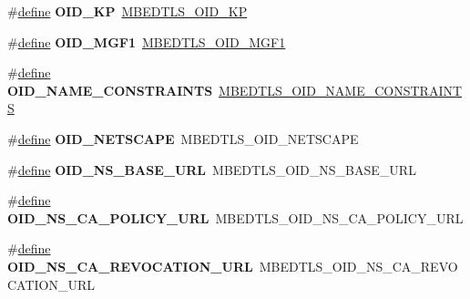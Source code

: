 \begin{DoxyCompactItemize}
\item 
\mbox{\label{compat-1_83_8h_a07ee4653fa24c1791a7e03db0a4e622c}} 
\#\hyperlink{structdefine}{define} {\bfseries O\+I\+D\+\_\+\+KP}~\hyperlink{oid_8h_a00f4d4d98ab235a1e3b5f3dcaf2e14f8}{M\+B\+E\+D\+T\+L\+S\+\_\+\+O\+I\+D\+\_\+\+KP}
\item 
\mbox{\label{compat-1_83_8h_a034e20febccf741aee9978e5e2f9c7e1}} 
\#\hyperlink{structdefine}{define} {\bfseries O\+I\+D\+\_\+\+M\+G\+F1}~\hyperlink{oid_8h_a41d20b2f31811636313feeafcd7959b9}{M\+B\+E\+D\+T\+L\+S\+\_\+\+O\+I\+D\+\_\+\+M\+G\+F1}
\item 
\mbox{\label{compat-1_83_8h_a7c1e723effe9aeccb1e5184c963e99a5}} 
\#\hyperlink{structdefine}{define} {\bfseries O\+I\+D\+\_\+\+N\+A\+M\+E\+\_\+\+C\+O\+N\+S\+T\+R\+A\+I\+N\+TS}~\hyperlink{oid_8h_acdfbc5ead965aaec5b1f82a575a8b2d2}{M\+B\+E\+D\+T\+L\+S\+\_\+\+O\+I\+D\+\_\+\+N\+A\+M\+E\+\_\+\+C\+O\+N\+S\+T\+R\+A\+I\+N\+TS}
\item 
\mbox{\label{compat-1_83_8h_a8731e59179aae8c01c3b2d658869cc0c}} 
\#\hyperlink{structdefine}{define} {\bfseries O\+I\+D\+\_\+\+N\+E\+T\+S\+C\+A\+PE}~M\+B\+E\+D\+T\+L\+S\+\_\+\+O\+I\+D\+\_\+\+N\+E\+T\+S\+C\+A\+PE
\item 
\mbox{\label{compat-1_83_8h_aafda755a94c6ce20ed39e0afdc820d57}} 
\#\hyperlink{structdefine}{define} {\bfseries O\+I\+D\+\_\+\+N\+S\+\_\+\+B\+A\+S\+E\+\_\+\+U\+RL}~M\+B\+E\+D\+T\+L\+S\+\_\+\+O\+I\+D\+\_\+\+N\+S\+\_\+\+B\+A\+S\+E\+\_\+\+U\+RL
\item 
\mbox{\label{compat-1_83_8h_a011c64b98f16e59f56cd49065ce1aee3}} 
\#\hyperlink{structdefine}{define} {\bfseries O\+I\+D\+\_\+\+N\+S\+\_\+\+C\+A\+\_\+\+P\+O\+L\+I\+C\+Y\+\_\+\+U\+RL}~M\+B\+E\+D\+T\+L\+S\+\_\+\+O\+I\+D\+\_\+\+N\+S\+\_\+\+C\+A\+\_\+\+P\+O\+L\+I\+C\+Y\+\_\+\+U\+RL
\item 
\mbox{\label{compat-1_83_8h_adad65916b0e7182080a7a439c1368cb0}} 
\#\hyperlink{structdefine}{define} {\bfseries O\+I\+D\+\_\+\+N\+S\+\_\+\+C\+A\+\_\+\+R\+E\+V\+O\+C\+A\+T\+I\+O\+N\+\_\+\+U\+RL}~M\+B\+E\+D\+T\+L\+S\+\_\+\+O\+I\+D\+\_\+\+N\+S\+\_\+\+C\+A\+\_\+\+R\+E\+V\+O\+C\+A\+T\+I\+O\+N\+\_\+\+U\+RL
\item 

\end{DoxyCompactItemize}
